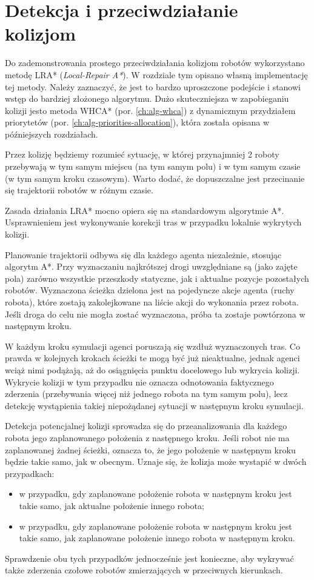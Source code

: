\section{Detekcja i przeciwdziałanie kolizjom}
\label{ch:alg-collision-avoid}
Do zademonstrowania prostego przeciwdziałania kolizjom robotów wykorzystano metodę LRA* ({\it Local-Repair A*}).
W rozdziale tym opisano własną implementację tej metody.
Należy zaznaczyć, że jest to bardzo uproszczone podejście i stanowi wstęp do bardziej złożonego algorytmu.
Dużo skuteczniejsza w zapobieganiu kolizji jesto metoda WHCA* (por. \ref{ch:alg-whca}) z dynamicznym przydziałem priorytetów (por. \ref{ch:alg-priorities-allocation}), która została opisana w późniejszych rozdziałach.

Przez kolizję będziemy rozumieć sytuację, w której przynajmniej 2 roboty przebywają w tym samym miejscu (na tym samym polu) i w tym samym czasie (w tym samym kroku czasowym). Warto dodać, że dopuszczalne jest przecinanie się trajektorii robotów w różnym czasie.

Zasada działania LRA* mocno opiera się na standardowym algorytmie A*. Usprawnieniem jest wykonywanie korekcji tras w przypadku lokalnie wykrytych kolizji.

Planowanie trajektorii odbywa się dla każdego agenta niezależnie, stosując algorytm A*. Przy wyznaczaniu najkrótszej drogi uwzględniane są (jako zajęte pola) zarówno wszystkie przeszkody statyczne, jak i aktualne pozycje pozostałych robotów. Wyznaczona ścieżka dzielona jest na pojedyncze akcje agenta (ruchy robota), które zostają zakolejkowane na liście akcji do wykonania przez robota. Jeśli droga do celu nie mogła zostać wyznaczona, próba ta zostaje powtórzona w następnym kroku.

W każdym kroku symulacji agenci poruszają się wzdłuż wyznaczonych tras. Co prawda w kolejnych krokach ścieżki te mogą być już nieaktualne, jednak agenci wciąż nimi podążają, aż do osiągnięcia punktu docelowego lub wykrycia kolizji.
Wykrycie kolizji w tym przypadku nie oznacza odnotowania faktycznego zderzenia (przebywania więcej niż jednego robota na tym samym polu), lecz detekcję wystąpienia takiej niepożądanej sytuacji w następnym kroku symulacji.

Detekcja potencjalnej kolizji sprowadza się do przeanalizowania dla każdego robota jego zaplanowanego położenia z następnego kroku. Jeśli robot nie ma zaplanowanej żadnej ścieżki, oznacza to, że jego położenie w następnym kroku będzie takie samo, jak w obecnym. Uznaje się, że kolizja może wystapić w dwóch przypadkach:
\begin{itemize}
	\item w przypadku, gdy zaplanowane położenie robota w następnym kroku jest takie samo, jak aktualne położenie innego robota;
	\item w przypadku, gdy zaplanowane położenie robota w następnym kroku jest takie samo, jak zaplanowane położenie innego robota w następnym kroku.
\end{itemize}
Sprawdzenie obu tych przypadków jednocześnie jest konieczne, aby wykrywać także zderzenia czołowe robotów zmierzających w przeciwnych kierunkach.

